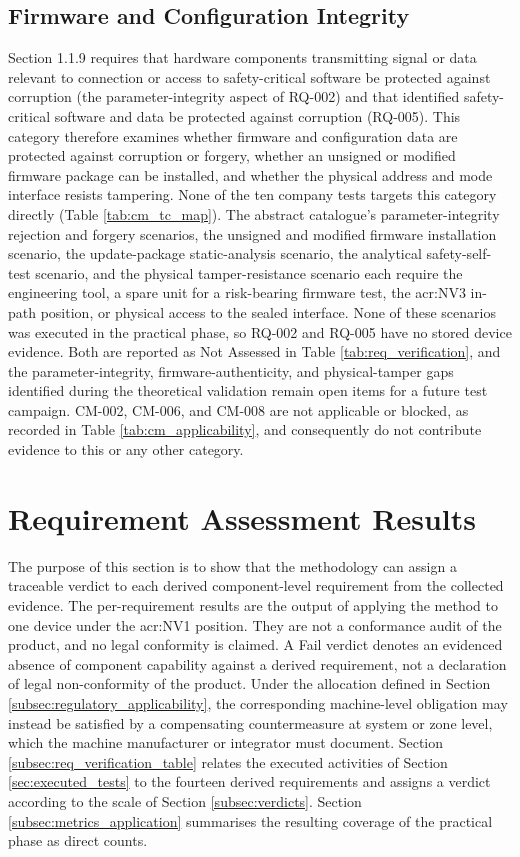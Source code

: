 \subsection{Firmware and Configuration Integrity}
\label{subsec:cat_config_firmware}
Section 1.1.9 requires that hardware components transmitting signal or data relevant to connection or access to safety-critical software be protected against corruption (the parameter-integrity aspect of RQ-002) and that identified safety-critical software and data be protected against corruption (RQ-005). This category therefore examines whether firmware and configuration data are protected against corruption or forgery, whether an unsigned or modified firmware package can be installed, and whether the physical address and mode interface resists tampering. None of the ten company tests targets this category directly (Table \ref{tab:cm_tc_map}). The abstract catalogue's parameter-integrity rejection and forgery scenarios, the unsigned and modified firmware installation scenario, the update-package static-analysis scenario, the analytical safety-self-test scenario, and the physical tamper-resistance scenario each require the engineering tool, a spare unit for a risk-bearing firmware test, the \gls{acr:NV3} in-path position, or physical access to the sealed interface. None of these scenarios was executed in the practical phase, so RQ-002 and RQ-005 have no stored device evidence. Both are reported as Not Assessed in Table \ref{tab:req_verification}, and the parameter-integrity, firmware-authenticity, and physical-tamper gaps identified during the theoretical validation remain open items for a future test campaign. CM-002, CM-006, and CM-008 are not applicable or blocked, as recorded in Table \ref{tab:cm_applicability}, and consequently do not contribute evidence to this or any other category.


\section{Requirement Assessment Results}
\label{sec:requirement_verification}

The purpose of this section is to show that the methodology can assign a traceable verdict to each derived component-level requirement from the collected evidence. The per-requirement results are the output of applying the method to one device under the \gls{acr:NV1} position. They are not a conformance audit of the product, and no legal conformity is claimed. A Fail verdict denotes an evidenced absence of component capability against a derived requirement, not a declaration of legal non-conformity of the product. Under the allocation defined in Section \ref{subsec:regulatory_applicability}, the corresponding machine-level obligation may instead be satisfied by a compensating countermeasure at system or zone level, which the machine manufacturer or integrator must document. Section \ref{subsec:req_verification_table} relates the executed activities of Section \ref{sec:executed_tests} to the fourteen derived requirements and assigns a verdict according to the scale of Section \ref{subsec:verdicts}. Section \ref{subsec:metrics_application} summarises the resulting coverage of the practical phase as direct counts.


